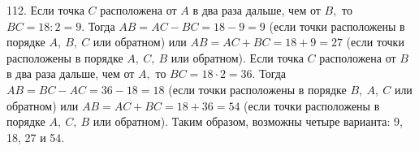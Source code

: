 112. Если точка $C$ расположена от $A$ в два раза дальше, чем от $B,$ то $BC=18:2=9.$ Тогда $AB=AC-BC=18-9=9$ (если точки расположены в порядке $A,\ B,\ C$ или обратном) или $AB=AC+BC=18+9=27$ (если точки расположены в порядке $A,\ C,\ B$ или обратном). Если точка $C$ расположена от $B$ в два раза дальше, чем от $A,$ то $BC=18\cdot2=36.$ Тогда $AB=BC-AC=36-18=18$ (если точки расположены в порядке $B,\ A,\ C$ или обратном) или $AB=AC+BC=18+36=54$ (если точки расположены в порядке $A,\ C,\ B$ или обратном). Таким образом, возможны четыре варианта: 9, 18, 27 и 54.\\
